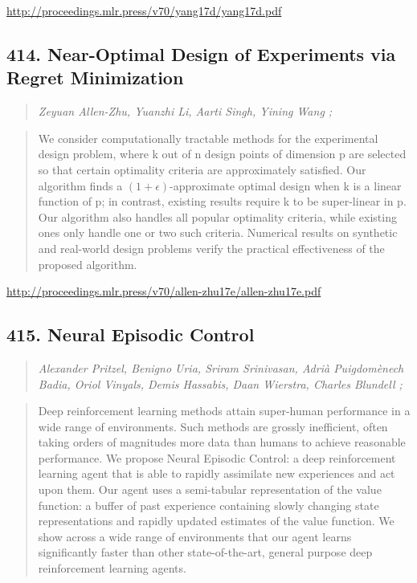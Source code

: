 \documentclass{article}
\begin{document}
\href{http://proceedings.mlr.press/v70/yang17d/yang17d.pdf}{http://proceedings.mlr.press/v70/yang17d/yang17d.pdf}

\subsection{414. Near-Optimal Design of Experiments via Regret Minimization}

\begin{quote}
\footnotesize{\textit{Zeyuan Allen-Zhu, Yuanzhi Li, Aarti Singh, Yining Wang ;}}

\end{quote}

\begin{quote}
    We consider computationally tractable methods for the experimental design problem, where k out of n design points of dimension p are selected so that certain optimality criteria are approximately satisfied. Our algorithm finds a $(1+\epsilon)$-approximate optimal design when k is a linear function of p; in contrast, existing results require k to be super-linear in p. Our algorithm also handles all popular optimality criteria, while existing ones only handle one or two such criteria. Numerical results on synthetic and real-world design problems verify the practical effectiveness of the proposed algorithm.  
\end{quote}

\href{http://proceedings.mlr.press/v70/allen-zhu17e/allen-zhu17e.pdf}{http://proceedings.mlr.press/v70/allen-zhu17e/allen-zhu17e.pdf}

\subsection{415. Neural Episodic Control}

\begin{quote}
\footnotesize{\textit{Alexander Pritzel, Benigno Uria, Sriram Srinivasan, Adrià Puigdomènech Badia, Oriol Vinyals, Demis Hassabis, Daan Wierstra, Charles Blundell ;}}

\end{quote}

\begin{quote}
    Deep reinforcement learning methods attain super-human performance in a wide range of environments. Such methods are grossly inefficient, often taking orders of magnitudes more data than humans to achieve reasonable performance. We propose Neural Episodic Control: a deep reinforcement learning agent that is able to rapidly assimilate new experiences and act upon them. Our agent uses a semi-tabular representation of the value function: a buffer of past experience containing slowly changing state representations and rapidly updated estimates of the value function. We show across a wide range of environments that our agent learns significantly faster than other state-of-the-art, general purpose deep reinforcement learning agents.  
\end{quote}
\end{document}
